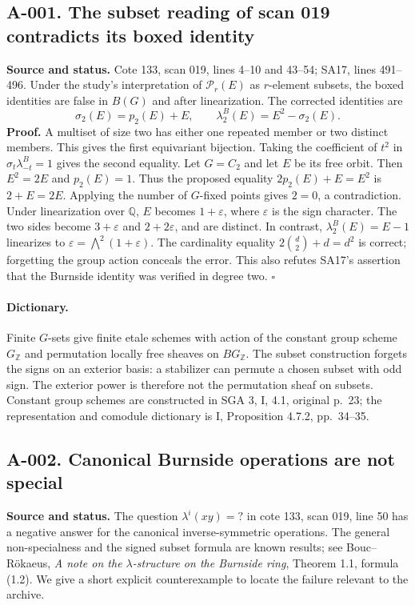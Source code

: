 \subsection*{A-001. The subset reading of scan 019 contradicts its boxed identity}
\textbf{Source and status.} Cote 133, scan 019, lines 4--10 and 43--54;
SA17, lines 491--496.  Under the study's interpretation of $\mathcal P_r(E)$
as $r$-element subsets, the boxed identities are false in $B(G)$ and after
linearization.  The corrected identities are
\[
 \sigma_2(E)=p_2(E)+E,\qquad
 \lambda_2^B(E)=E^2-\sigma_2(E).
\]
\textbf{Proof.} A multiset of size two has either one repeated member or two
distinct members.  This gives the first equivariant bijection.  Taking the
coefficient of $t^2$ in $\sigma_t\lambda^B_{-t}=1$ gives the second equality.
Let $G=C_2$ and let $E$ be its free orbit.  Then $E^2=2E$ and $p_2(E)=1$.
Thus the proposed equality $2p_2(E)+E=E^2$ is $2+E=2E$.  Applying the number
of $G$-fixed points gives $2=0$, a contradiction.  Under linearization over
$\mathbb Q$, $E$ becomes $1+\varepsilon$, where $\varepsilon$ is the sign
character.  The two sides become $3+\varepsilon$ and $2+2\varepsilon$,
and are distinct.  In contrast, $\lambda_2^B(E)=E-1$ linearizes to
$\varepsilon=\bigwedge^2(1+\varepsilon)$.
The cardinality equality $2\binom d2+d=d^2$ is correct; forgetting the group
action conceals the error.  This also refutes SA17's assertion that the
Burnside identity was verified in degree two. \hfill$\square$

\paragraph{Dictionary.}
Finite $G$-sets give finite etale schemes with action of the constant group
scheme $G_{\mathbb Z}$ and permutation locally free sheaves on
$BG_{\mathbb Z}$.  The subset construction forgets the signs on an exterior
basis: a stabilizer can permute a chosen subset with odd sign.  The exterior
power is therefore not the permutation sheaf on subsets.  Constant group
schemes are constructed in SGA 3, I, 4.1, original p.~23; the representation
and comodule dictionary is I, Proposition 4.7.2, pp.~34--35.

\subsection*{A-002. Canonical Burnside operations are not special}
\textbf{Source and status.} The question $\lambda^i(xy)=?$ in cote 133,
scan 019, line 50 has a negative answer for the canonical inverse-symmetric
operations.  The general non-specialness and the signed subset formula are
known results; see Bouc--R\"okaeus, \emph{A note on the $\lambda$-structure on
the Burnside ring}, Theorem 1.1, formula (1.2).  We give a short explicit
counterexample to locate the failure relevant to the archive.

